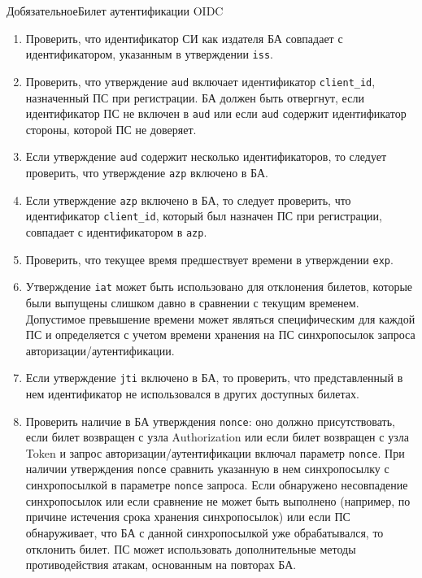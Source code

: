 \begin{appendix}{Д}{обязательное}{Билет аутентификации OIDC}
\begin{enumerate}
\item  
Проверить, что идентификатор СИ как издателя БА совпадает с идентификатором, 
указанным в утверждении \lstinline{iss}.

\item 
Проверить, что утверждение \lstinline{aud} включает идентификатор 
\lstinline{client_id}, назначенный ПС при регистрации.
%
БА должен быть отвергнут, если идентификатор ПС не включен в \lstinline{aud}
или если \lstinline{aud} содержит идентификатор стороны, которой ПС не 
доверяет. 

\item 
Если утверждение \lstinline{aud} содержит несколько идентификаторов, 
то следует проверить, что утверждение \lstinline{azp} включено в БА. 

\item  
Если утверждение \lstinline{azp} включено в БА, то следует проверить, 
что идентификатор \lstinline{client_id}, который был назначен ПС при 
регистрации, совпадает с идентификатором в \lstinline{azp}.

\item 
Проверить, что текущее время предшествует времени в утверждении 
\lstinline{exp}. 

\item 
Утверждение \lstinline{iat} может быть использовано для отклонения
билетов, которые были выпущены слишком давно в сравнении с текущим временем.
Допустимое превышение времени может являться специфическим 
для каждой ПС и определяется с учетом времени хранения на ПС синхропосылок 
запроса авторизации/аутентификации.

\item
Если утверждение \lstinline{jti} включено в БА, то проверить, что 
представленный в нем идентификатор не использовался в других доступных
билетах.

\item 
Проверить наличие в БА утверждения \lstinline{nonce}: оно должно 
присутствовать, если билет возвращен с узла Authorization или если билет 
возвращен с узла Token и запрос авторизации/аутентификации включал параметр 
\lstinline{nonce}.
%
При наличии утверждения \lstinline{nonce} сравнить указанную в нем 
синхропосылку с синхропосылкой в параметре \lstinline{nonce} запроса.
%
Если обнаружено несовпадение синхропосылок или если сравнение не может быть 
выполнено (например, по причине истечения срока хранения синхропосылок) или если
ПС обнаруживает, что БА с данной синхропосылкой уже обрабатывался, 
то отклонить билет.
%
ПС может использовать дополнительные методы противодействия атакам, основанным 
на повторах БА. 


\end{enumerate}
\end{appendix}
